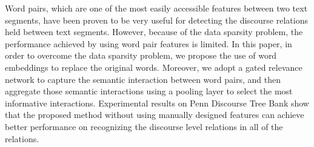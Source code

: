 Word pairs, which are one of the most easily accessible features between two text segments, have been proven to be very useful for detecting the discourse relations held between text segments. However, because of the data sparsity problem, the performance achieved by using word pair features is limited. In this paper, in order to overcome the data sparsity problem, we propose the use of word embeddings to replace the original words. Moreover, we adopt a gated relevance network to capture the semantic interaction between word pairs, and then aggregate those semantic interactions using a pooling layer to select the most informative interactions. Experimental results on Penn Discourse Tree Bank show that the proposed method without using manually designed features can achieve better performance on recognizing the discourse level relations in all of the relations.
